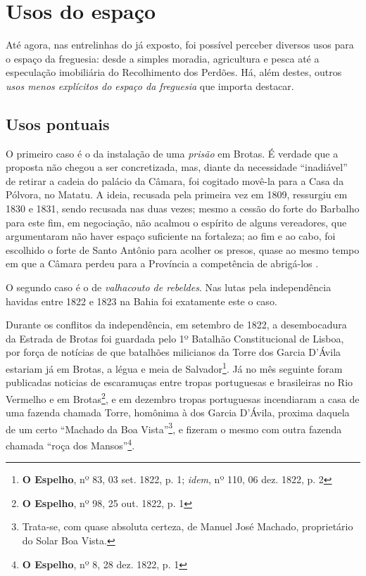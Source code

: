 \section{Usos do espaço}\label{sec:2.4}

Até agora, nas entrelinhas do já exposto, foi possível perceber diversos usos para o espaço da freguesia: desde a simples moradia, agricultura e pesca até a especulação imobiliária do Recolhimento dos Perdões. Há, além destes, outros \textit{usos menos explícitos do espaço da freguesia} que importa destacar.

\subsection{Usos pontuais}

O primeiro caso é o da instalação de uma \textit{prisão} em Brotas. É verdade que a proposta não chegou a ser concretizada, mas, diante da necessidade ``inadiável'' de retirar a cadeia do palácio da Câmara, foi cogitado movê-la para a Casa da Pólvora, no Matatu. A ideia, recusada pela primeira vez em 1809, ressurgiu em 1830 e 1831, sendo recusada nas duas vezes; mesmo a cessão do forte do Barbalho para este fim, em negociação, não acalmou o espírito de alguns vereadores, que argumentaram não haver espaço suficiente na fortaleza; ao fim e ao cabo, foi escolhido o forte de Santo Antônio para acolher os presos, quase ao mesmo tempo em que a Câmara perdeu para a Província a competência de abrigá-los \cite[pp.~304-305]{ruy_camara_1953}.

O segundo caso é o de \textit{valhacouto de rebeldes}. Nas lutas pela independência havidas entre 1822 e 1823 na Bahia foi exatamente este o caso. 

Durante os conflitos da independência, em setembro de 1822, a desembocadura da Estrada de Brotas foi guardada pelo 1º Batalhão Constitucional de Lisboa, por força de notícias de que batalhões milicianos da Torre dos Garcia D'Ávila estariam já em Brotas, a légua e meia de Salvador\footnote{\textbf{O Espelho}, nº 83, 03 set. 1822, p. 1; \textit{idem}, nº 110, 06 dez. 1822, p. 2}. Já no mês seguinte foram publicadas noticias de escaramuças entre tropas portuguesas e brasileiras no Rio Vermelho e em Brotas\footnote{\textbf{O Espelho}, nº 98, 25 out. 1822, p. 1}, e em dezembro tropas portuguesas incendiaram a casa de uma fazenda chamada Torre, homônima à dos Garcia D'Ávila, proxima daquela de um certo ``Machado da Boa Vista''\footnote{Trata-se, com quase absoluta certeza, de Manuel José Machado, proprietário do Solar Boa Vista.}, e fizeram o mesmo com outra fazenda chamada ``roça dos Mansos''\footnote{\textbf{O Espelho}, nº 8, 28 dez. 1822, p. 1}.

